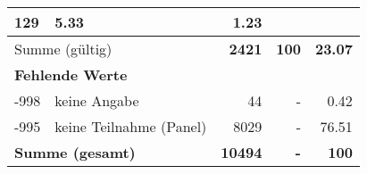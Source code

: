 \begin{longtable}{lXrrr}
       \num{129} &
       \num[round-mode=places,round-precision=2]{5,33} &
         \num[round-mode=places,round-precision=2]{1,23} \\
     \midrule
     \multicolumn{2}{l}{Summe (gültig)} &
       \textbf{\num{2421}} &
     \textbf{100} &
       \textbf{\num[round-mode=places,round-precision=2]{23,07}} \\
     \multicolumn{5}{l}{\textbf{Fehlende Werte}}\\
       -998 &
       keine Angabe &
         \num{44} &
        - &
         \num[round-mode=places,round-precision=2]{0,42} \\
       -995 &
       keine Teilnahme (Panel) &
         \num{8029} &
        - &
         \num[round-mode=places,round-precision=2]{76,51} \\
     \midrule
     \multicolumn{2}{l}{\textbf{Summe (gesamt)}} &
          \textbf{\num{10494}} &
        \textbf{-} &
        \textbf{100} \\
     \bottomrule
     \end{longtable}
     
